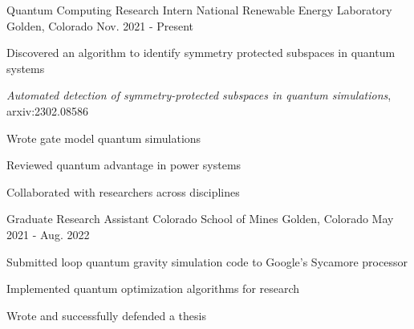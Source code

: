

\begin{cventries}

  \cventry
    {Quantum Computing Research Intern}
    {National Renewable Energy Laboratory}
    {Golden, Colorado}
    {Nov. 2021 - Present}
    {
      \begin{cvitems}
        \item {Discovered an algorithm to identify symmetry protected subspaces in quantum systems}\\
        \begin{cvitems}
          \item {\textit{Automated detection of symmetry-protected subspaces in quantum simulations}, arxiv:2302.08586}\\
        \end{cvitems}
        \item {Wrote gate model quantum simulations}
        \item {Reviewed quantum advantage in power systems}
        \item {Collaborated with researchers across disciplines}
      \end{cvitems}
    }

  \cventry
    {Graduate Research Assistant}
    {Colorado School of Mines}
    {Golden, Colorado}
    {May 2021 - Aug. 2022}
    {
      \begin{cvitems}
        \item {Submitted loop quantum gravity simulation code to Google's Sycamore processor}
        \item {Implemented quantum optimization algorithms for research}
        \item {Wrote and successfully defended a thesis}\\
      \end{cvitems}
    }


\end{cventries}
